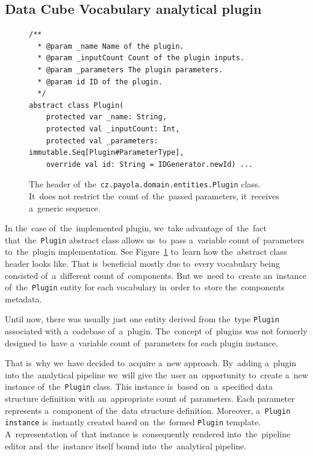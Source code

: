 \subsection{Data Cube Vocabulary analytical plugin}

\begin{figure}
  \begin{verbatim}
/**
  * @param _name Name of the plugin.
  * @param _inputCount Count of the plugin inputs.
  * @param _parameters The plugin parameters.
  * @param id ID of the plugin.
  */
abstract class Plugin(
    protected var _name: String,
    protected val _inputCount: Int,
    protected val _parameters: immutable.Seq[Plugin#ParameterType],
    override val id: String = IDGenerator.newId) ...
  \end{verbatim}
  \caption{The header of~the~\texttt{cz.payola.domain.entities.Plugin} class. It~does not restrict the~count
  of~the~passed parameters, it~receives a~generic sequence.}
  \label{fig:plugin-trait-code}
\end{figure}

\begin{sloppypar}
In the~case of~the~implemented plugin, we~take advantage of~the~fact that~the~\texttt{Plugin} abstract class allows us~to~pass a~variable count of~parameters to~the~plugin implementation. See Figure~\ref{fig:plugin-trait-code} to~learn how the~abstract class header 
looks like. That is~beneficial mostly due to~every vocabulary being consisted of~a~different count of~components. But we~need to~create an~instance of~the~\texttt{Plugin} entity
for each vocabulary in~order to~store the~components metadata.
\end{sloppypar}

Until now, there was usually just one entity derived from the~type \texttt{Plugin} associated with
a~codebase of~a~plugin. The~concept of~plugins was not formerly designed to~have
a~variable count of~parameters for each plugin instance.

That is~why we~have decided to~acquire a~new approach. By~adding a~plugin 
into the~analytical pipeline we~will give the~user an~opportunity to~create a~new instance of~the~\texttt{Plugin} class. This instance is~based on~a~specified data structure definition
with an~appropriate count of~parameters. Each parameter represents a~component 
of the~data structure definition. Moreover, a~\texttt{Plugin instance} is~instantly created 
based on~the~formed \texttt{Plugin} template. A~representation of~that instance is~consequently 
rendered into~the~pipeline editor and~the~instance itself bound into~the~analytical pipeline.


